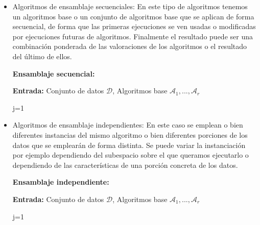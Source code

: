 \begin{itemize}
	\item Algoritmos de ensamblaje secuenciales: En este tipo de algoritmos tenemos un algoritmos base o un conjunto de algoritmos base que se aplican de forma secuencial, de forma que las primeras ejecuciones se ven usadas o modificadas por ejecuciones futuras de algoritmos. Finalmente el resultado puede ser una combinación ponderada de las valoraciones de los algoritmos o el resultado del último de ellos.
	
	
	\begin{algorithm}[H]{\textbf{Ensamblaje secuencial:}}
		\SetAlgoLined
		
		\textbf{Entrada: } Conjunto de datos $\mathcal{D}$, Algoritmos base $\mathcal{A}_1 , ... , \mathcal{A}_r$
		
		j=1
		
	
	\end{algorithm}
	\item Algoritmos de ensamblaje independientes: En este caso se emplean o bien diferentes instancias del mismo algoritmo o bien diferentes porciones de los datos que se emplearán de forma distinta. Se puede variar la instanciación por ejemplo dependiendo del subespacio sobre el que queramos ejecutarlo o dependiendo de las características de una porción concreta de los datos.
	
	\begin{algorithm}[H]{\textbf{Ensamblaje independiente:}}
		\SetAlgoLined
		
		\textbf{Entrada: } Conjunto de datos $\mathcal{D}$, Algoritmos base $\mathcal{A}_1 , ... , \mathcal{A}_r$
		
		j=1
		
		
	\end{algorithm}
\end{itemize}